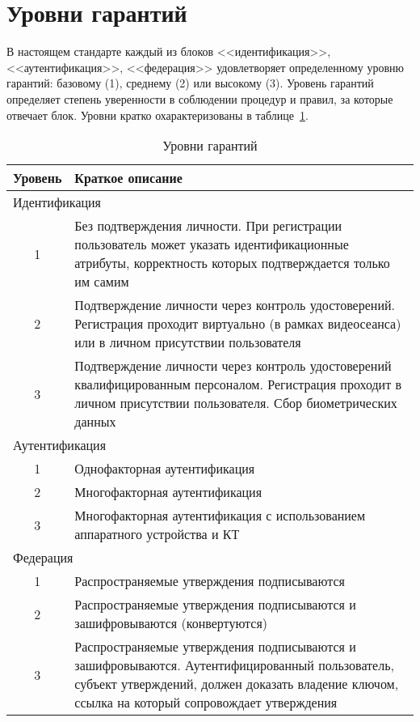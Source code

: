 \section{Уровни гарантий}\label{COMMON.Levels}

В настоящем стандарте каждый из блоков <<идентификация>>, <<аутентификация>>, 
<<федерация>> удовлетворяет определенному уровню гарантий: базовому (1), 
среднему (2) или высокому (3).
%
Уровень гарантий определяет степень уверенности в соблюдении процедур и правил, 
за которые отвечает блок.
%
Уровни кратко охарактеризованы в таблице~\ref{Table.COMMON.AL}. 

\begin{table}[hbt]
\caption{Уровни гарантий}\label{Table.COMMON.AL}
\begin{tabular}{|c|p{14cm}|}
\hline
Уровень & Краткое описание\\
\hline
\hline
\multicolumn{2}{|l|}{Идентификация}\\
\hline
\hline
%
1 & Без подтверждения личности. При регистрации пользователь может
указать идентификационные атрибуты, корректность которых подтверждается 
только им самим\\ 
\hline
%
2 & Подтверждение личности через контроль удостоверений.
Регистрация проходит виртуально (в рамках видеосеанса) или в личном присутствии 
пользователя\\
\hline
%
3 & Подтверждение личности через контроль удостоверений квалифицированным 
персоналом. Регистрация проходит в личном присутствии пользователя.
Сбор биометрических данных\\
%
\hline
\hline
\multicolumn{2}{|l|}{Аутентификация}\\
\hline
\hline
%
1 & Однофакторная аутентификация\\
\hline
%
2 & Многофакторная аутентификация\\
\hline
%
3 & Многофакторная аутентификация с использованием аппаратного устройства 
и КТ\\
%
\hline
\hline
\multicolumn{2}{|l|}{Федерация}\\
\hline
\hline
%
1 & Распространяемые утверждения подписываются\\
\hline
%
2 & Распространяемые утверждения подписываются и зашифровываются 
(конвертуются)\\
\hline
%
3 & Распространяемые утверждения подписываются и зашифровываются.
Аутентифицированный пользователь, субъект утверждений, должен доказать владение 
ключом, ссылка на который сопровождает утверждения\\ 
\hline
\end{tabular}
\end{table}

